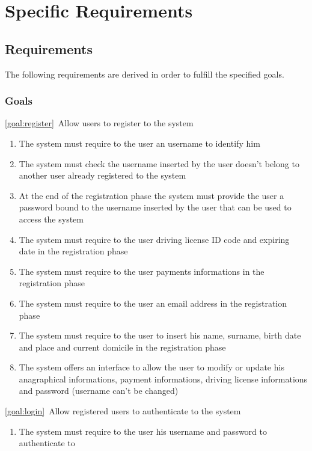 \section{Specific Requirements}

\subsection{Requirements}
The following requirements are derived in order to fulfill the specified goals.
\subsubsection{Goals}
	\begin{description}
		\item \ref{goal:register}\ Allow users to register to the system
			\begin{enumerate}[label=\textbf{R\arabic*}]
  				\item The system must require to the user an username to identify him
   				\item The system must check the username inserted by the user doesn't belong to
   				another user already registered to the system 
   				\item At the end of the registration phase the system must provide the user a password
   				bound to the username inserted by the user that can be used to access the system
   				\item The system must require to the user driving license ID code and expiring date in the
   				registration phase
   				\item The system must require to the user payments informations in the registration phase
   				\item The system must require to the user an email address in the registration phase
   				\item The system must require to the user to insert his name, surname, birth date and
   				place and current domicile in the registration phase
   				\item The system offers an interface to allow the user to modify or update his
   				anagraphical informations, payment informations, driving license informations and
   				password (username can't be changed)
  			\end{enumerate}
		\item \ref{goal:login}\ Allow registered users to authenticate to the system
			\begin{enumerate}[resume*]
  				\item The system must require to the user his username and password to authenticate to

\end{enumerate}
\end{description}
